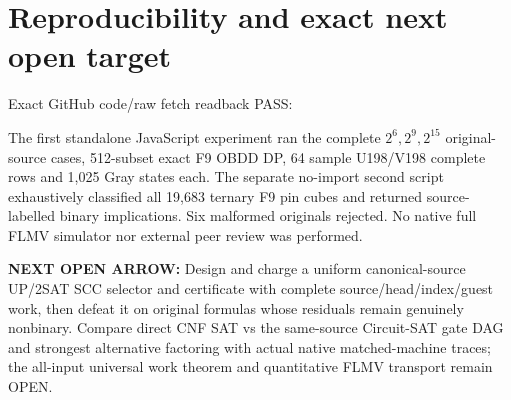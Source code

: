 \documentclass[11pt]{article}
\begin{document}
\section{Reproducibility and exact next open target}
Exact GitHub code/raw fetch readback PASS:
\begin{description}
\item[] 
\item[] 
\item[] 
\item[] 
\end{description}
The first standalone JavaScript experiment ran the complete $2^6,2^9,2^{15}$ original-source cases, 512-subset exact F9 OBDD DP, 64 sample U198/V198 complete rows and 1,025 Gray states each. The separate no-import second script exhaustively classified all 19,683 ternary F9 pin cubes and returned source-labelled binary implications. Six malformed originals rejected. No native full FLMV simulator nor external peer review was performed.

\noindent\textbf{NEXT OPEN ARROW:} Design and charge a uniform canonical-source UP/2SAT SCC selector and certificate with complete source/head/index/guest work, then defeat it on original formulas whose residuals remain genuinely nonbinary. Compare direct CNF SAT vs the same-source Circuit-SAT gate DAG and strongest alternative factoring with actual native matched-machine traces; the all-input universal work theorem and quantitative FLMV transport remain OPEN.
\end{document}
